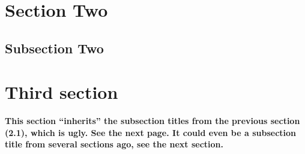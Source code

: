 \documentclass{article}
\newcommand\rightheader{\firstrightxmark}
\renewcommand{\sectionmark}[1]{%
    \extramarksleft{\thesection\ #1}}
\begin{document}
\section{Section Two}

 \lipsum[3]

\subsection{Subsection Two}

 \lipsum[4-7]

\section{Third section}
\label{sec:flaw}

\textbf{This section ``inherits'' the subsection titles from the
  previous section (2.1), which is ugly. See the next page. It could
  even be a subsection title from several sections ago, see the next
  section.}

\medskip

\lipsum

\newcommand\checkrightreset{%
  \ifextramarksmissing{left}
  {}
  {%
    \ifnum\extramarkslast{which}=0
      \extramarksreset{right}%
    \fi
  }%
}


\newcommand\checkrightresetbefore{%
  \ifnum \value{thispage}<\value{page}\checkrightreset\fi
}

\renewcommand{\sectionmark}[1]{%
  \extramarksleft{\thesection. #1}%
  \extramarksput{which}{0}%
  \setcounter{thispage}{\value{page}}%
  \ifdim\pagetotal<0.5\pagegoal
    \renewcommand\rightheader{\checkrightreset\firstrightxmark}%
  \else
    \renewcommand\rightheader{%
      \checkrightresetbefore\firstrightxmark\checkrightreset}%
  \fi
}
\end{document}
